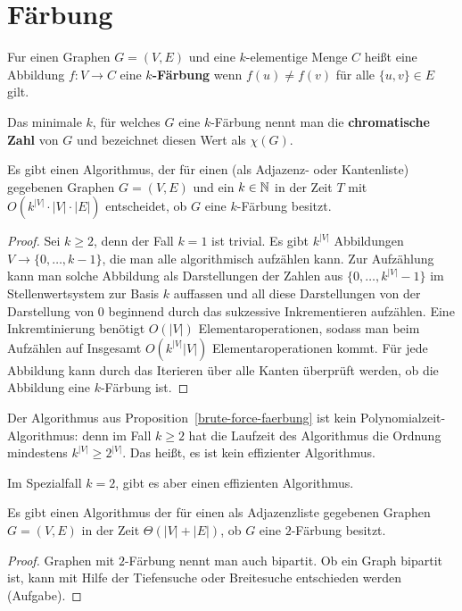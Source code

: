 \section{Färbung} 

\begin{defn}
	Fur einen Graphen $ G = (V,E)$ und eine $k$-elementige Menge $C$ heißt eine Abbildung $ f : V\to C$ eine \textbf{$k$-Färbung} wenn $f(u) \ne f(v)$ für alle $\{u,v\} \in E$ gilt. 
	
	Das minimale $k$, für welches $G$ eine $k$-Färbung nennt man die \textbf{chromatische Zahl} von $G$ und bezeichnet diesen Wert als $\chi(G)$. 
\end{defn} 

\begin{prop} \label{brute-force-faerbung}
	Es gibt einen Algorithmus, der für einen (als Adjazenz- oder Kantenliste) gegebenen Graphen $G=(V,E)$ und ein $k \in \mathbb{N}$ in der Zeit $T$ mit $O(k^{|V|} \cdot |V| \cdot |E|)$ entscheidet, ob $G$ eine $k$-Färbung besitzt. 
\end{prop} 
\begin{proof} 
	Sei $k \ge 2$, denn der Fall $k=1$ ist trivial. 
	Es gibt $k^{|V|}$ Abbildungen $V \to \{0,\ldots,k-1\}$, die man alle algorithmisch aufzählen kann. Zur Aufzählung kann man solche Abbildung als Darstellungen der Zahlen aus $\{0,\ldots,k^{|V|} -1\}$ im Stellenwertsystem zur Basis $k$ auffassen und all diese Darstellungen von der Darstellung von $0$ beginnend durch das sukzessive Inkrementieren aufzählen. Eine Inkremtinierung benötigt $O(|V|)$ Elementaroperationen, sodass man beim Aufzählen auf Insgesamt $O(k^{|V|} |V|)$ Elementaroperationen kommt. Für jede Abbildung kann durch das Iterieren über alle Kanten überprüft werden, ob die Abbildung eine $k$-Färbung ist. 
\end{proof} 


\begin{bem}
	Der Algorithmus aus Proposition~\ref{brute-force-faerbung} ist kein Polynomialzeit-Algorithmus: denn im Fall $k \ge 2$ hat die Laufzeit des Algorithmus die Ordnung mindestens $
k^|V| \ge  2^{|V|}$. Das heißt, es ist kein effizienter Algorithmus. 
	
	Im Spezialfall $k=2$, gibt es aber einen effizienten Algorithmus.
\end{bem} 

\begin{prop}
		Es gibt einen Algorithmus der für einen als Adjazenzliste gegebenen Graphen $G=(V,E)$ in der Zeit $\Theta(|V|+|E|)$, ob $G$ eine $2$-Färbung besitzt. 
\end{prop} 
\begin{proof}
	Graphen mit $2$-Färbung nennt man auch bipartit. Ob ein Graph bipartit ist, kann mit Hilfe der Tiefensuche oder Breitesuche entschieden werden (Aufgabe). 
\end{proof} 

